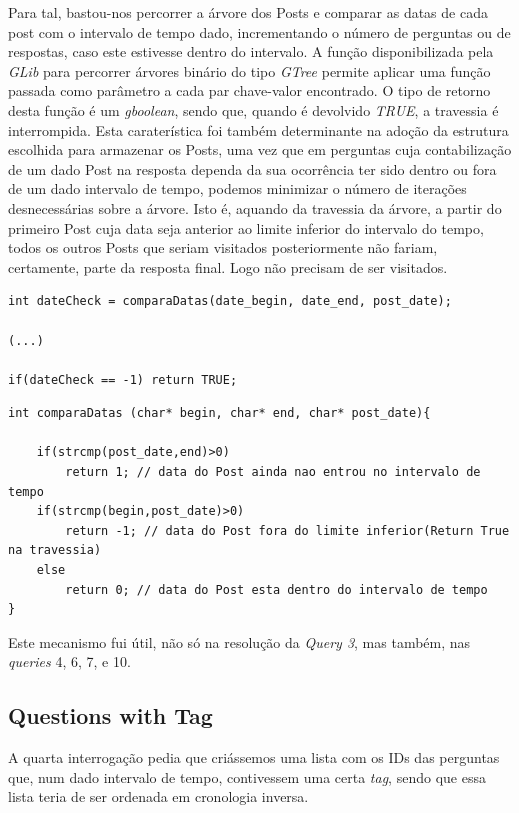 \documentclass[a4paper, 11pt, oneside]{article}
\begin{document}
Para tal, bastou-nos percorrer a árvore dos Posts e comparar as datas de cada post com o intervalo de tempo dado, incrementando o número de perguntas ou de respostas, caso este estivesse dentro do intervalo. A função disponibilizada pela \textit{GLib} para percorrer árvores binário do tipo \textit{GTree} permite aplicar uma função passada como parâmetro a cada par chave-valor encontrado. O tipo de retorno desta função é um \textit{gboolean}, sendo que, quando é devolvido \textit{TRUE}, a travessia é interrompida. Esta caraterística foi também determinante na adoção da estrutura escolhida para armazenar os Posts, uma vez que em perguntas cuja contabilização de um dado Post na resposta dependa da sua ocorrência ter sido dentro ou fora de um dado intervalo de tempo, podemos minimizar o número de iterações desnecessárias sobre a árvore. Isto é, aquando da travessia da árvore, a partir do primeiro Post cuja data seja anterior ao limite inferior do intervalo do tempo, todos os outros Posts que seriam visitados posteriormente não fariam, certamente, parte da resposta final. Logo não precisam de ser visitados. 

\begin{lstlisting}[caption=Query 3 - mecanismo de diminuição de iterações desnecessárias]
int dateCheck = comparaDatas(date_begin, date_end, post_date);

(...)

if(dateCheck == -1) return TRUE; 
\end{lstlisting}

\begin{lstlisting}[caption=Implementação da função comparaDatas]
int comparaDatas (char* begin, char* end, char* post_date){ 

	if(strcmp(post_date,end)>0) 
		return 1; // data do Post ainda nao entrou no intervalo de tempo 
	if(strcmp(begin,post_date)>0) 
		return -1; // data do Post fora do limite inferior(Return True na travessia)
	else 
		return 0; // data do Post esta dentro do intervalo de tempo
}
\end{lstlisting}

Este mecanismo fui útil, não só na resolução da \textit{Query 3}, mas também, nas \textit{queries} 4, 6, 7, e 10. 

\subsection{Questions with Tag}
A quarta interrogação pedia que criássemos uma lista com os IDs das perguntas que, num dado intervalo de tempo, contivessem uma certa \textit{tag}, sendo que essa lista teria de ser ordenada em cronologia inversa.
\end{document}
